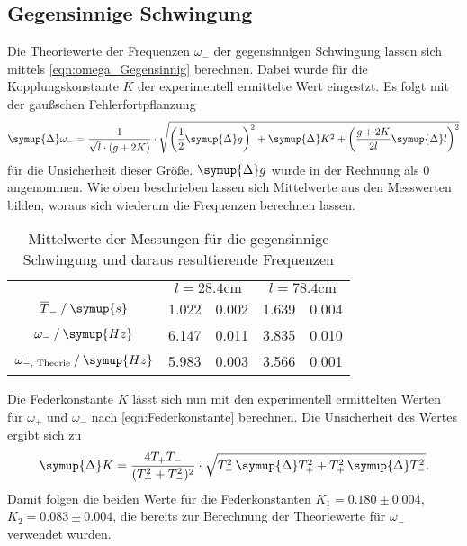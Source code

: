 \subsection{Gegensinnige Schwingung}
\label{subsec:Gegensinnig}
Die Theoriewerte der Frequenzen $\omega_-$ der gegensinnigen Schwingung lassen sich mittels \autoref{eqn:omega_Gegensinnig} berechnen. Dabei wurde für die Kopplungskonstante $K$ 
der experimentell ermittelte Wert eingestzt. Es folgt mit der gaußschen Fehlerfortpflanzung
\begin{equation*}
    \label{eqn:DeltaOmegaMinus}
    \symup{\Delta}\omega_- = \frac{1}{\sqrt{l} \cdot (g + 2K)} \cdot \sqrt{\left(\frac{1}{2}\symup{\Delta}g\right)^2 + \symup{\Delta}K^2 + \left(\frac{g+2K}{2l}\symup{\Delta}l\right)^2}
\end{equation*}
für die Unsicherheit dieser Größe. $\symup{\Delta}g$ wurde in der Rechnung als $0$ angenommen. Wie oben beschrieben lassen sich Mittelwerte aus den Messwerten bilden,
woraus sich wiederum die Frequenzen berechnen lassen. 

\begin{table}
    \centering
    \caption{Mittelwerte der Messungen für die gegensinnige Schwingung und daraus resultierende Frequenzen}
    \begin{tabular}{c S @{${}\pm{}$} S S @{${}\pm{}$} S}
    \toprule
    &  &  \\
    \cmidrule(lr){2-3}\cmidrule(lr){4-5}
    {$\overline{T}_- \mathbin{/} \symup{s}$}                & 1.022 & 0.002 & 1.639 & 0.004 \\
    {$\omega_- \mathbin{/} \symup{Hz}$}                     & 6.147 & 0.011 & 3.835 & 0.010 \\
    {$\omega_{{-}\text{, Theorie}} \mathbin{/} \symup{Hz}$} & 5.983 & 0.003 & 3.566 & 0.001 \\
    \bottomrule
    \end{tabular}
\end{table}
Die Federkonstante $K$ lässt sich nun mit den experimentell ermittelten Werten für $\omega_+$ und $\omega_-$ nach \autoref{eqn:Federkonstante} berechnen.
Die Unsicherheit des Wertes ergibt sich zu
\begin{equation*}
    \label{eqn:DeltaK}
    \symup{\Delta}K = \frac{4T_+T_-}{(T_+^2 + T_-^2)^2} \cdot \sqrt{T_-^2 \, \symup{\Delta}T_+^2 + T_+^2 \, \symup{\Delta}T_-^2}.
\end{equation*}
Damit folgen die beiden Werte für die Federkonstanten $K_1 = 0.180 \pm 0.004$, $K_2 = 0.083 \pm 0.004$, die bereits zur Berechnung der Theoriewerte für $\omega_-$ verwendet wurden.

